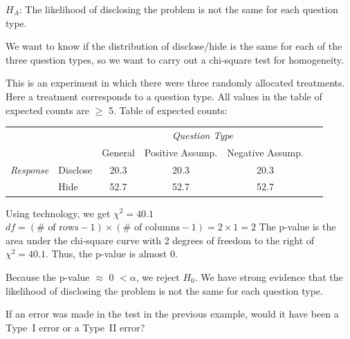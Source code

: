 \begin{examplewrap}
\begin{nexample}
\begin{description}
\newline $H_A$: The likelihood of disclosing the problem is not the same for each question type.  
\item[\inferencestep{Choose}] We want to know if the distribution of disclose/hide is the same for each of the three question types, so we want to carry out a chi-square test for homogeneity.  
\item[\inferencestep{Check}] This is an experiment in which there were three randomly allocated treatments.  Here a treatment corresponds to a question type.  All values in the table of expected counts are $\ge$ 5.
Table of expected counts:\vspace{-4mm}
\begin{center}
\begin{tabular}{l l c c c l}
								&			& \multicolumn{3}{c}{\textit{Question Type}}	&\hspace{17mm}\ 		\\
\cline{3-5}
								&			& General		& Positive Assump. & Negative Assump.	\\
\cline{2-5}
\textit{Response}									& Disclose		& 20.3		& 20.3 & 20.3 	\\
				& Hide			& 52.7		& 52.7 &  52.7	\\
\cline{2-5}
\end{tabular}
\end{center}

\item[\inferencestep{Calculate}]  Using technology, we get $\chi^2 = 40.1$
\newline $df = (\# \text{ of rows} - 1) \times (\# \text{ of columns} - 1) = 2\times 1 = 2$
\newline  The p-value is the area under the chi-square curve with 2 degrees of freedom to the right of $\chi^2=40.1$.  Thus, the p-value is almost 0.
\item[\inferencestep{Conclude}]  Because the p-value $\approx$ 0 $ < \alpha$, we reject $H_0$. We have strong evidence that the likelihood of disclosing the problem is not the same for each question type.
\end{description}
\end{nexample}
\end{examplewrap}

\begin{exercisewrap}
\begin{nexercise}
If an error was made in the test in the previous example, would it have been a Type~I error or a Type~II error?\footnotemark
\end{nexercise}
\end{exercisewrap}

